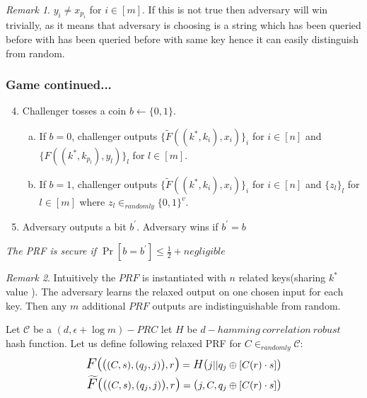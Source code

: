 \documentclass[hyperref={pdfpagelabels=false}]{beamer}
\theoremstyle{remark}
\newtheorem*{remark}{Remark}
\begin{document}
\begin{frame}

\begin{remark}
$y_i \neq x_{p_i}$ for $i \in \left[m\right]$. If this is not true then adversary will win trivially, as it means that adversary is choosing is a string which has been queried before with has been queried before with same key hence it can easily distinguish from random.
\end{remark}
\end{frame}
\begin{frame}
\frametitle{Game continued...}
\begin{enumerate}
\setcounter{enumi}{3}
\item Challenger tosses a coin $b \leftarrow \{0,1\}$.\pause
\begin{enumerate}[(a)]
\item If $b=0$, challenger outputs $\{\widetilde{F}((k^*,k_i),x_i)\}_i$ for $i \in \left[n\right]$ and $\{F((k^*,k_{p_l}),y_l)\}_l$ for $l \in \left[m\right]$.\pause
\item If $b=1$, challenger outputs $\{\widetilde{F}((k^*,k_i),x_i)\}_i$ for $i \in \left[n\right]$ and $\{z_l\}_l$ for $l \in \left[m\right]$ where $z_l \in_{randomly} \{0,1\}^v$.\pause
\end{enumerate}
\item Adversary outputs a bit $b^\prime$. Adversary wins if $b^\prime = b$\pause
\end{enumerate}
\textit{The PRF is secure if $\Pr\left[b=b^\prime\right] \leq \frac{1}{2} + negligible$} \pause
\begin{remark}
Intuitively the $PRF$ is instantiated with $n$ related keys(sharing $k^*$ value ). The adversary learns the relaxed output on one chosen input for each key. Then any $m$ additional $PRF$ outputs are indistinguishable from random.
\end{remark}
\end{frame}

\begin{lemma}[2]
Let $\mathcal{C}$ be a $(d,\epsilon+\log{m})-PRC$ let  $H$ be $d-hamming\ correlation\ robust$ hash function. Let us define following relaxed PRF for $C \in_{randomly} \mathcal{C}:$
\begin{align*}
\mathlarger{\mathlarger{F(}} \mathlarger{(}  (C,s),(q_j,j)\mathlarger{)}, r \mathlarger{\mathlarger{)}} = \mathlarger{H(} j||q_j \oplus [C(r)\cdot s] \mathlarger{)}
\\
\mathlarger{\mathlarger{\widetilde{F}(}} \mathlarger{(}  (C,s),(q_j,j)\mathlarger{)}, r \mathlarger{\mathlarger{)}} = \mathlarger{(} j, C, q_j \oplus [C(r)\cdot s] \mathlarger{)}
\end{align*}
\end{lemma}
\end{document}
